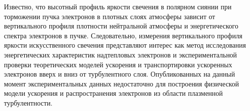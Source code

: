 \documentclass[12pt,a4paper]{article}
\begin{document}
Известно, что высотный профиль яркости свечения в полярном сиянии при торможении пучка электронов в плотных слоях атмосферы зависит от вертикального профиля плотности нейтральной атмосферы и энергетического спектра электронов в пучке. Следовательно, измерения вертикального профиля яркости искусственного свечения представляют интерес как метод исследования энергетических характеристик надтепловых электронов и экспериментальной проверки теоретических моделей ускорения и транспортировки ускоренных электронов вверх и вниз от турбулентного слоя.
Опубликованных на данный момент экспериментальных данных \cite{HASLETT1974, Gustavsson2001, Gustavsson2008, Pedersen2011} недостаточно для построения физической модели ускорения и распространения электронов из области плазменной турбулентности.


\end{document}
